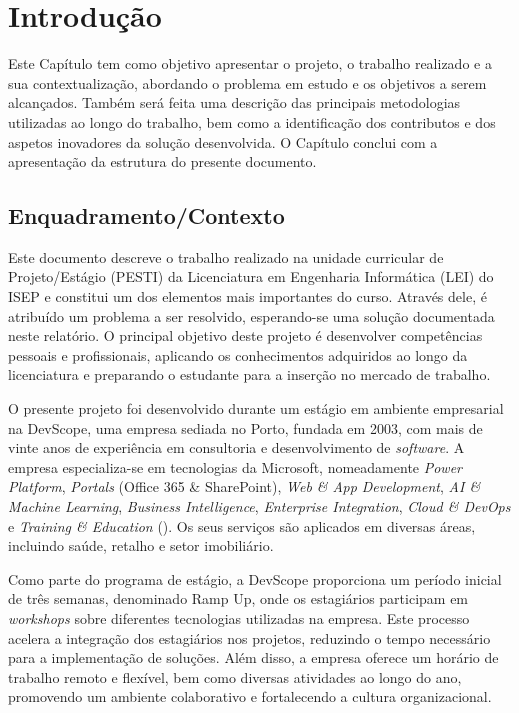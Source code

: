 \chapter{Introdução}
\label{chap:Introdução}

Este Capítulo tem como objetivo apresentar o projeto, o trabalho realizado e a sua contextualização, abordando o problema em estudo e os objetivos a serem alcançados. Também será feita uma descrição das principais metodologias utilizadas ao longo do trabalho, bem como a identificação dos contributos e dos aspetos inovadores da solução desenvolvida. O Capítulo conclui com a apresentação da estrutura do presente documento.


\section{Enquadramento/Contexto} 
\label{sec:chap1_introduction} 

Este documento descreve o trabalho realizado na unidade curricular de Projeto/Estágio (PESTI) da Licenciatura em Engenharia Informática (LEI) do ISEP e constitui um dos elementos mais importantes do curso. Através dele, é atribuído um problema a ser resolvido, esperando-se uma solução documentada neste relatório. O principal objetivo deste projeto é desenvolver competências pessoais e profissionais, aplicando os conhecimentos adquiridos ao longo da licenciatura e preparando o estudante para a inserção no mercado de trabalho.

O presente projeto foi desenvolvido durante um estágio em ambiente empresarial na DevScope, uma empresa sediada no Porto, fundada em 2003, com mais de vinte anos de experiência em consultoria e desenvolvimento de \textit{software}. A empresa especializa-se em tecnologias da Microsoft, nomeadamente \textit{Power Platform}, \textit{Portals} (Office 365 \& SharePoint), \textit{Web \& App Development}, \textit{AI \& Machine Learning}, \textit{Business Intelligence}, \textit{Enterprise Integration}, \textit{Cloud \& DevOps} e \textit{Training \& Education} (\cite{DevScopeSolutions}). Os seus serviços são aplicados em diversas áreas, incluindo saúde, retalho e setor imobiliário.

Como parte do programa de estágio, a DevScope proporciona um período inicial de três semanas, denominado Ramp Up, onde os estagiários participam em \textit{workshops} sobre diferentes tecnologias utilizadas na empresa. Este processo acelera a integração dos estagiários nos projetos, reduzindo o tempo necessário para a implementação de soluções. Além disso, a empresa oferece um horário de trabalho remoto e flexível, bem como diversas atividades ao longo do ano, promovendo um ambiente colaborativo e fortalecendo a cultura organizacional.

